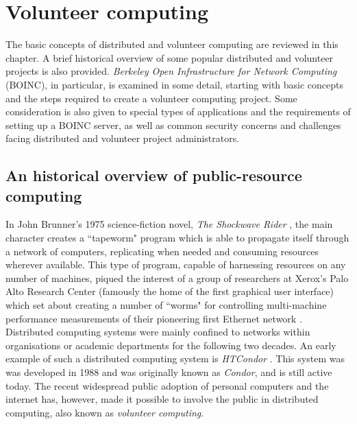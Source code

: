 \chapter{Volunteer computing}
\vspace{-2em}
\minitoc

The basic concepts of distributed and volunteer computing are reviewed in this chapter.  A brief historical overview   of some popular distributed and volunteer projects is also provided.  \emph{Berkeley Open Infrastructure for Network Computing} (BOINC), in particular,  is examined in some detail, starting with basic concepts and the steps required to create a volunteer computing project. Some consideration is also given to special types of applications and the requirements of setting up a BOINC server, as well as common security concerns and challenges facing distributed and volunteer project administrators.  
 
\section{An historical overview of public-resource computing} \label{VChist}
In John Brunner's 1975 science-fiction novel, \emph{The Shockwave Rider} \cite{brunner}, the main character creates a ``tapeworm" program which is able to propagate itself through a network of computers, replicating when needed and consuming resources wherever available. This type of program, capable of harnessing resources on any number of machines, piqued the interest of a group of researchers at Xerox's Palo Alto Research Center (famously the home of the first graphical user interface) which set about creating a number of ``worms"   for controlling multi-machine performance measurements of their pioneering first Ethernet network \cite{worms}. 
Distributed computing systems  were mainly confined to networks within organisations or academic departments for the following two decades.
An early example  of such a distributed computing system is \textsl{HTCondor} \cite{condor, condor1}. This system was was developed in 1988 and was originally known as \textsl{Condor}, and is still active today.
The recent widespread public adoption of personal computers and the internet has, however,  made it possible to involve the public in distributed computing, also known as \emph{volunteer computing}.

